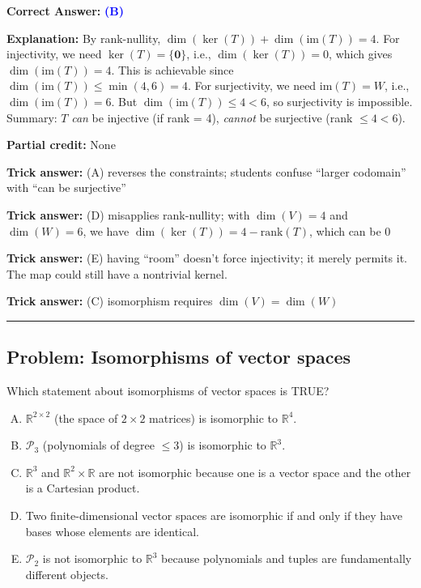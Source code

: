 \documentclass[12pt]{amsart}
\newcommand{\divider}{
  \vspace{-1em}
  \noindent
  \raisebox{-0.15ex}{\textbullet}%
  \hspace{0.5em}%
  \rule[0.5ex]{0.95\textwidth}{1.0pt}%
  \hspace{0.5em}%
  \raisebox{-0.15ex}{\textbullet}%
  \vspace{0em}
}
\begin{document}
\textbf{Correct Answer:} \textcolor{blue}{\textbf{(B)}}

\textbf{Explanation:} By rank-nullity, $\dim(\ker(T)) + \dim(\text{im}(T)) = 4$. For injectivity, we need $\ker(T) = \{\mathbf{0}\}$, i.e., $\dim(\ker(T)) = 0$, which gives $\dim(\text{im}(T)) = 4$. This is achievable since $\dim(\text{im}(T)) \leq \min(4, 6) = 4$. For surjectivity, we need $\text{im}(T) = W$, i.e., $\dim(\text{im}(T)) = 6$. But $\dim(\text{im}(T)) \leq 4 < 6$, so surjectivity is impossible. Summary: $T$ \emph{can} be injective (if rank = 4), \emph{cannot} be surjective (rank $\leq 4 < 6$).

\textbf{Partial credit:} None

\textbf{Trick answer:} (A) reverses the constraints; students confuse ``larger codomain'' with ``can be surjective''

\textbf{Trick answer:} (D) misapplies rank-nullity; with $\dim(V) = 4$ and $\dim(W) = 6$, we have $\dim(\ker(T)) = 4 - \text{rank}(T)$, which can be 0

\textbf{Trick answer:} (E) having ``room'' doesn't force injectivity; it merely permits it. The map could still have a nontrivial kernel.

\textbf{Trick answer:} (C) isomorphism requires $\dim(V) = \dim(W)$

\divider

\subsection*{Problem: Isomorphisms of vector spaces}

Which statement about isomorphisms of vector spaces is TRUE?

\begin{enumerate}[(A)]
\item $\mathbb{R}^{2 \times 2}$ (the space of $2 \times 2$ matrices) is isomorphic to $\mathbb{R}^4$.
\item $\mathcal{P}_3$ (polynomials of degree $\leq 3$) is isomorphic to $\mathbb{R}^3$.
\item $\mathbb{R}^3$ and $\mathbb{R}^2 \times \mathbb{R}$ are not isomorphic because one is a vector space and the other is a Cartesian product.
\item Two finite-dimensional vector spaces are isomorphic if and only if they have bases whose elements are identical.
\item $\mathcal{P}_2$ is not isomorphic to $\mathbb{R}^3$ because polynomials and tuples are fundamentally different objects.
\end{enumerate}
\end{document}
